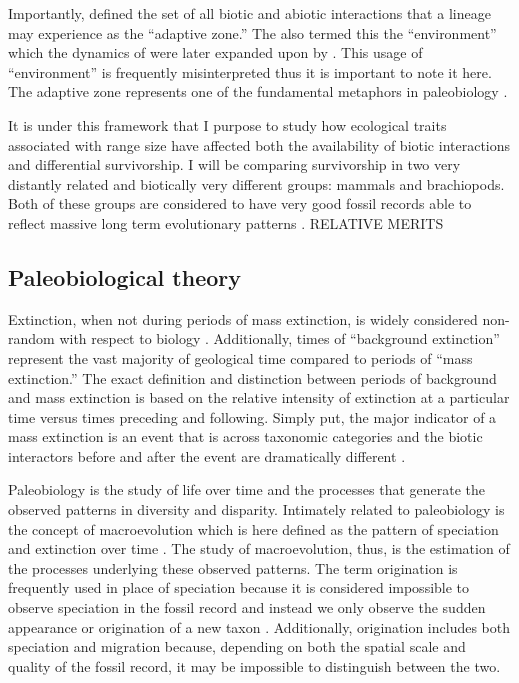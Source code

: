 \documentclass[12pt,letterpaper]{article}
\begin{document}
Importantly, \citet{Simpson1944} defined the set of all biotic and abiotic interactions that a lineage may experience as the ``adaptive zone.'' The also termed this the ``environment'' which the dynamics of were later expanded upon by \citet{VanValen1973}. This usage of ``environment'' is frequently misinterpreted thus it is important to note it here. The adaptive zone represents one of the fundamental metaphors in paleobiology \citep{Simpson1944,Simpson1953}. 

It is under this framework that I purpose to study how ecological traits associated with range size have affected both the availability of biotic interactions and differential survivorship. I will be comparing survivorship in two very distantly related and biotically very different groups: mammals and brachiopods. Both of these groups are considered to have very good fossil records able to reflect massive long term evolutionary patterns \citep{Mark1977}. RELATIVE MERITS



\subsection{Paleobiological theory}
Extinction, when not during periods of mass extinction, is widely considered non-random with respect to biology \citep{Jablonski1986}. Additionally, times of ``background extinction'' represent the vast majority of geological time compared to periods of ``mass extinction.'' The exact definition and distinction between periods of background and mass extinction is based on the relative intensity of extinction at a particular time versus times preceding and following. Simply put, the major indicator of a mass extinction is an event that is across taxonomic categories and the biotic interactors before and after the event are dramatically different \citet{Jablonski1986,Jablonski2005,Kitchell1986,Kitchell1991}.

Paleobiology is the study of life over time and the processes that generate the observed patterns in diversity and disparity. Intimately related to paleobiology is the concept of macroevolution which is here defined as the pattern of speciation and extinction over time \citep{Jablonski2008a}. The study of macroevolution, thus, is the estimation of the processes underlying these observed patterns. The term origination is frequently used in place of speciation because it is considered impossible to observe speciation in the fossil record and instead we only observe the sudden appearance or origination of a new taxon \citep{Coyne2004}. Additionally, origination includes both speciation and migration because, depending on both the spatial scale and quality of the fossil record, it may be impossible to distinguish between the two.
\end{document}
